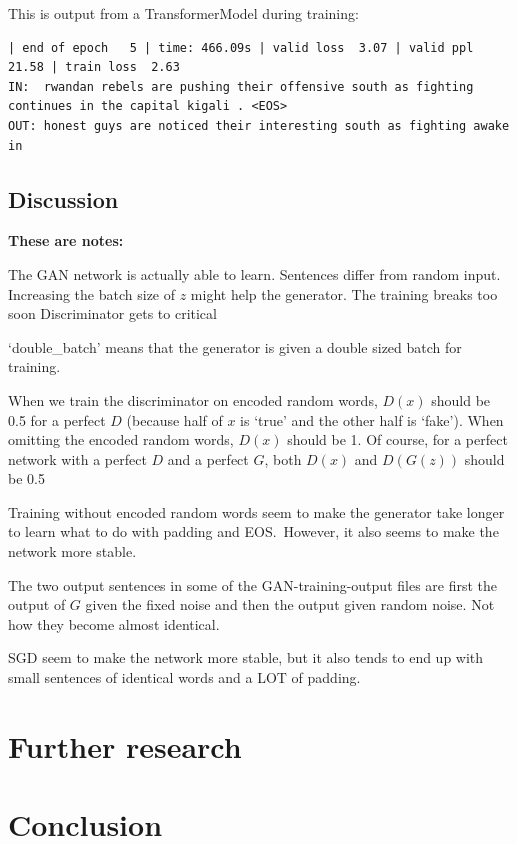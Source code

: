 \documentclass{article}
\begin{document}
This is output from a TransformerModel during training:

\begin{verbatim}
| end of epoch   5 | time: 466.09s | valid loss  3.07 | valid ppl    21.58 | train loss  2.63
IN:  rwandan rebels are pushing their offensive south as fighting continues in the capital kigali . <EOS>
OUT: honest guys are noticed their interesting south as fighting awake in 
\end{verbatim}

\subsection{Discussion}\label{sec:discussion}

\textbf{These are notes:}

The GAN network is actually able to learn.
Sentences differ from random input.
Increasing the batch size of $z$ might help the generator.
The training breaks too soon
Discriminator gets to critical

`double\_batch' means that the generator is given a double sized batch for
training.

When we train the discriminator on encoded random words, $D(x)$ should be 0.5
for a perfect $D$ (because half of $x$ is `true' and the other half is `fake').
When omitting the encoded random words, $D(x)$ should be 1. Of course, for a
perfect network with a perfect $D$ and a perfect $G$, both $D(x)$ and $D(G(z))$
should be 0.5 

Training without encoded random words seem to make the generator take longer to
learn what to do with padding and EOS.\ However, it also seems to make the
network more stable.

The two output sentences in some of the GAN-training-output files are first the
output of $G$ given the fixed noise and then the output given random noise. Not
how they become almost identical.

SGD seem to make the network more stable, but it also tends to end up with small
sentences of identical words and a LOT of padding.

\section{Further research}\label{sec:furtherResearch}


\section{Conclusion}\label{sec:conclusion}


\newpage
\printbibliography%
\end{document}
